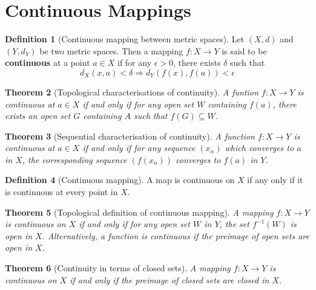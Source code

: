 \documentclass[10pt, oneside, reqno]{amsart}
\theoremstyle{plain}%
\newtheorem{thm}{Theorem}[section]
\theoremstyle{definition}
\newtheorem{defn}[thm]{Definition}
\theoremstyle{remark}
\newcommand{\met}{(X,d)}
\begin{document}



\section{Continuous Mappings} %
\label{sec:continuous_mappings}

\begin{defn}[Continuous mapping between metric spaces]
	Let $\met$ and $(Y, d_Y)$ be two metric spaces.  Then a mapping $f : X \rightarrow Y$ is said to be \textbf{continuous} at a point $a \in X$ if for any $\epsilon > 0$, there exists $\delta$ such that \[
		d_X(x,a) < \delta \Rightarrow d_Y(f(x), f(a)) < \epsilon
	\]
\end{defn}

\begin{thm}[Topological characterisations of continuity]
	A funtion $f : X \rightarrow Y$ is continuous at $a \in X$ if and only if for any open set $W$ containing $f(a)$, there exists an open set $G$ containing $A$ such that $f(G) \subseteq W$.  
\end{thm}

\begin{thm}[Sequential characterisation of continuity]
	A function $f: X \rightarrow Y$ is continuous at $a \in X$ if and only if for any sequence $(x_n)$ which converges to $a$ in $X$, the corresponding sequence $(f(x_n))$ converges to $f(a)$ in $Y$.
\end{thm}


\begin{defn}[Continuous mapping]
	A map is continuous on $X$ if any only if it is continuous at every point in $X$.
\end{defn}

\begin{thm}[Topological definition of continuous mapping]
	A mapping $f: X \rightarrow Y$ is continuous on $X$ if and only if for any open set $W$ in $Y$, the set $f^{-1}(W)$ is open in $X$. Alternatively, a function is continuous if the preimage of open sets are open in $X$.
\end{thm}

\begin{thm}[Continuity in terms of closed sets]
	A mapping $f: X \rightarrow Y$ is continuous on $X$ if and only if the preimage of closed sets are closed in $X$.
\end{thm}

\end{document}

